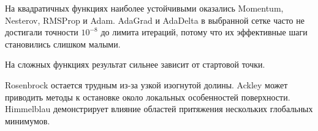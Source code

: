 ﻿\documentclass[14pt,a4paper]{extarticle}
\begin{document}
На квадратичных функциях наиболее устойчивыми оказались Momentum, Nesterov, RMSProp и Adam. AdaGrad и AdaDelta в выбранной сетке часто не достигали точности $10^{-8}$ до лимита итераций, потому что их эффективные шаги становились слишком малыми.

На сложных функциях результат сильнее зависит от стартовой точки.

Rosenbrock остается трудным из-за узкой изогнутой долины. Ackley может приводить методы к остановке около локальных особенностей поверхности. Himmelblau демонстрирует влияние областей притяжения нескольких глобальных минимумов.
\end{document}
